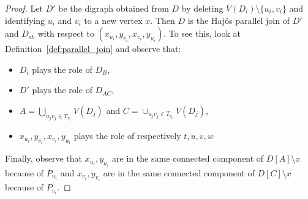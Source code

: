 \begin{proof}
    Let $D'$ be the digraph obtained from $D$ by deleting $V(D_{i})\setminus \{u_i,v_i\}$ and identifying $u_i$ and $v_i$ to a new vertex $x$. 
    Then $D$ is the Haj\'os parallel join of $D'$ and $D_{ab}$ with respect to $(x_{u_i}, y_{v_i}, x_{v_i}, y_{u_i})$. To see this, look at Definition~\ref{def:parallel_join} and observe that: 
    \begin{itemize}
        \item $D_{i}$ plays the role of $D_B$,
        \item $D'$ plays the role of $D_{AC}$,
        \item $A=\bigcup_{u_jv_j \in T_{u_i}} V(D_{j})$ and $C=\cup_{u_jv_j \in T_{v_i}} V(D_{j})$,
        \item $x_{u_i}, y_{v_i}, x_{v_i}, y_{u_i}$ plays the role of respectively $t,u,v,w$
    \end{itemize} 
    Finally, observe that $x_{u_i}, y_{u_i}$ are in the same connected component of $D[A]\setminus x$ because of $P_{u_i}$ and $x_{v_i}, y_{v_i}$ are in the same connected component of $D[C] \setminus x$ because of $P_{v_i}$. 
    
   
\end{proof}







